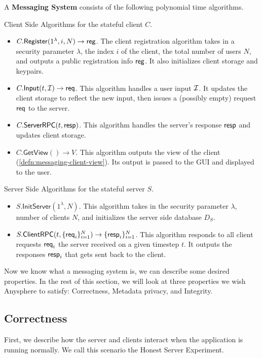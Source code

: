 \begin{definition}
\label{defn:messaging-scheme}
A \textbf{Messaging System} consists of the following polynomial time algorithms.

Client Side Algorithms for the stateful client $C$.
\begin{itemize}
    \item $C.\mathsf{Register}(1^{\lambda}, i, N) \to \mathsf{reg}$. The client registration algorithm takes in a security parameter $\lambda$, the index $i$ of the client, the total number of users $N$, and outputs a public registration info $\mathsf{reg}$. It also initializes client storage and keypairs.
    
    \item $C.\mathsf{Input}(t, \mathcal{I}) \to \mathsf{req}$. This algorithm handles a user input $\mathcal{I}$. It updates the client storage to reflect the new input, then issues a (possibly empty) request $\mathsf{req}$ to the server.
    
    \item $C.\mathsf{ServerRPC}(t, \mathsf{resp})$. This algorithm handles the server's response $\mathsf{resp}$ and updates client storage.
    
    \item $C.\mathsf{GetView}() \to V$. This algorithm outputs the view of the client (\cref{defn:messaging-client-view}). Its output is passed to the GUI and displayed to the user.
\end{itemize}

Server Side Algorithms for the stateful server $S$.

\begin{itemize}
    \item $S.\mathsf{InitServer}(1^{\lambda}, N)$. This algorithm takes in the security parameter $\lambda$, number of clients $N$, and initializes the server side database $D_S$.
    \item $S.\mathsf{ClientRPC}(t, \{\mathsf{req}_i\}_{i = 1}^N) \to \{\mathsf{resp}_i\}_{i = 1}^N$. This algorithm responds to all client requests $\mathsf{req}_i$ the server received on a given timestep $t$. It outputs the responses $\mathsf{resp}_i$ that gets sent back to the client.
\end{itemize}
\end{definition}


Now we know what a messaging system is, we can describe some desired properties. In the rest of this section, we will look at three properties we wish Anysphere to satisfy: Correctness, Metadata privacy, and Integrity.

\subsection{Correctness}
\label{subsec:messaging-correctness}
First, we describe how the server and clients interact when the application is running normally. We call this scenario the Honest Server Experiment.

